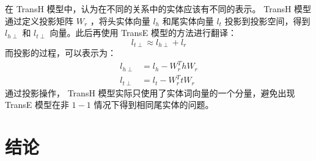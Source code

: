 \documentclass{llncs}
\begin{document}
在 TransH 模型中，认为在不同的关系中的实体应该有不同的表示。 TransH 模型通过定义投影矩阵 $W_r$ ，将头实体向量 $l_h$ 和尾实体向量 $l_t$ 投影到投影空间，得到 $l_{h\perp}$ 和 $l_{t\perp}$ 向量。此后再使用 TransE 模型的方法进行翻译：
\begin{displaymath}
l_{t\perp}\approx l_{h\perp}+l_r
\end{displaymath}
而投影的过程，可以表示为：
\begin{displaymath}
	\begin{split}
	l_{h\perp}&=l_h-W_r^ThW_r \\
	l_{t\perp}&=l_t-W_r^TtW_r
	\end{split}
\end{displaymath}
通过投影操作， TransH 模型实际只使用了实体词向量的一个分量，避免出现 TransE 模型在非 $1-1$ 情况下得到相同尾实体的问题。

\section{结论}


%

	
\end{document}
